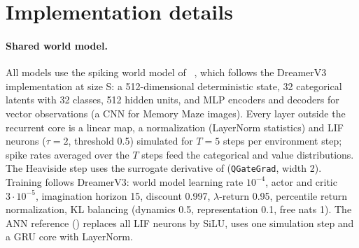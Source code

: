 \clearpage
\setcounter{page}{1}
\setcounter{section}{0}
\renewcommand{\thesection}{\Alph{section}}
\maketitlesupplementary

\section{Implementation details}
\label{supp:impl}

\paragraph{Shared world model.}
All models use the spiking world model of \swm~\cite{sun2025spikingwm}, which follows the DreamerV3 implementation at size S: a 512-dimensional deterministic state, 32 categorical latents with 32 classes, 512 hidden units, and MLP encoders and decoders for vector observations (a CNN for Memory Maze images).
Every layer outside the recurrent core is a linear map, a normalization (LayerNorm statistics) and LIF neurons ($\tau=2$, threshold 0.5) simulated for $T=5$ steps per environment step; spike rates averaged over the $T$ steps feed the categorical and value distributions.
The Heaviside step uses the surrogate derivative of \swm (\texttt{QGateGrad}, width 2).
Training follows DreamerV3: world model learning rate $10^{-4}$, actor and critic $3\cdot10^{-5}$, imagination horizon 15, discount 0.997, $\lambda$-return 0.95, percentile return normalization, KL balancing (dynamics 0.5, representation 0.1, free nats 1).
The ANN reference (\dv) replaces all LIF neurons by SiLU, uses one simulation step and a GRU core with LayerNorm.

